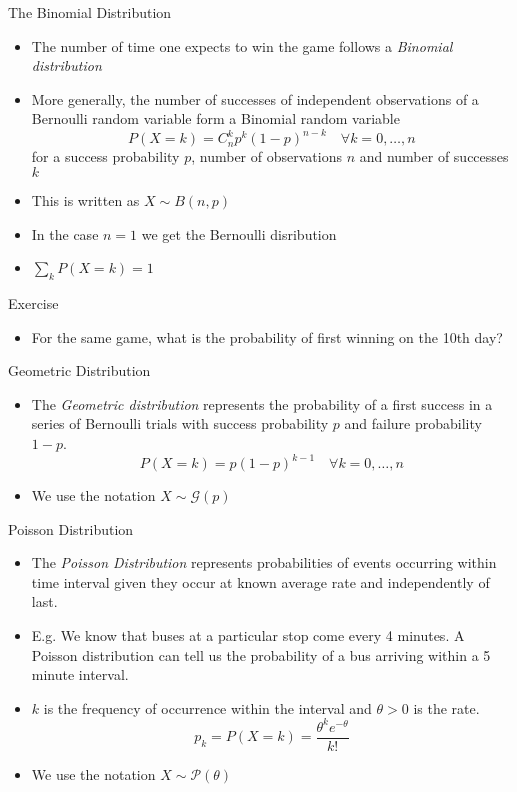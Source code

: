 \documentclass{beamer}
\begin{document}
\begin{frame}{The Binomial Distribution} 
\begin{itemize} 
 \item The number of time one expects to win the game follows a \emph{Binomial distribution}  
\item More generally, the number of successes of independent observations of a Bernoulli random variable form a Binomial random variable 
\begin{displaymath} 
 P(X = k) = C^k_n p^k (1-p)^{n-k} \quad \forall k = 0, \ldots, n
\end{displaymath}
for a success probability $p$, number of observations $n$ and number of successes $k$ 
\item This is written as $X \sim B(n, p)$ 
\item In the case $n=1$ we get the Bernoulli disribution 
\item $\sum_k P(X = k) = 1$  
\end{itemize}
\end{frame}

\begin{frame}{Exercise} 
\begin{itemize} 
 \item For the same game, what is the probability of first winning on the 10th day? 
\end{itemize}
\end{frame}

\begin{frame}{Geometric Distribution} 
\begin{itemize} 
 \item The \emph{Geometric distribution} represents the probability of a first success in a series of Bernoulli trials with success probability $p$ and failure probability $1-p$.  
 \begin{displaymath} 
 P(X = k) = p (1-p)^{k-1} \quad \forall k = 0, \ldots, n
\end{displaymath}
\item We use the notation $X \sim \mathcal{G}(p)$
\end{itemize}
\end{frame}

\begin{frame}{Poisson Distribution}  
\begin{itemize} 
 \item The \emph{Poisson Distribution} represents probabilities of events occurring within time interval given they occur at known average rate and independently of last.  
 \item E.g. We know that buses at a particular stop come every 4 minutes. A Poisson distribution can tell us the probability of a bus arriving within a 5 minute interval. 
 \item $k$ is the frequency of occurrence within the interval and $\theta > 0$ is the rate. 
 \begin{displaymath} 
  p_k = P(X = k) = \frac{\theta^k e^{-\theta}}{k!}
 \end{displaymath}
\item We use the notation $X \sim \mathcal{P}(\theta)$
\end{itemize}
\end{frame}
\end{document}

